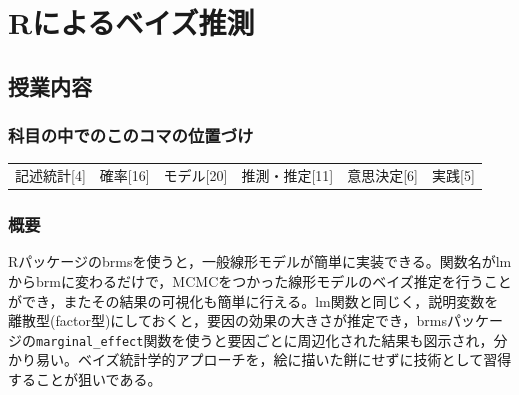 \section{Rによるベイズ推測}
\label{lesson29}

\subsection{授業内容}
\subsubsection{科目の中でのこのコマの位置づけ}
\begin{tabular}[t]{cccccc}
    記述統計[4] & 確率[16] & モデル[20] & 推測・推定[11] & 意思決定[6] & 実践[5]
\end{tabular}
\subsubsection{概要}
Rパッケージのbrmsを使うと，一般線形モデルが簡単に実装できる。関数名がlmからbrmに変わるだけで，MCMCをつかった線形モデルのベイズ推定を行うことができ，またその結果の可視化も簡単に行える。lm関数と同じく，説明変数を離散型(factor型)にしておくと，要因の効果の大きさが推定でき，brmsパッケージの\verb|marginal_effect|関数を使うと要因ごとに周辺化された結果も図示され，分かり易い。ベイズ統計学的アプローチを，絵に描いた餅にせずに技術として習得することが狙いである。

